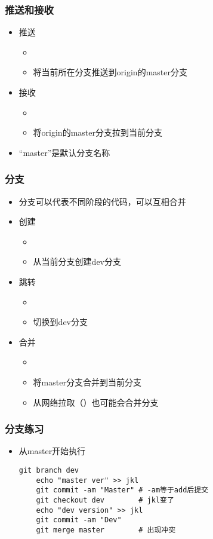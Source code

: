 \begin{frame} [fragile]
	\frametitle{推送和接收}
	\linespread{1.5}
	\begin{itemize}
	\item 推送
		\begin{itemize}
		\item {}
		\item 将当前所在分支推送到origin的master分支
		\end{itemize}
	\item 接收
		\begin{itemize}
		\item {}
		\item 将origin的master分支拉到当前分支
		\end{itemize}
	\item ``master''是默认分支名称
	\end{itemize}
\end{frame}

\begin{frame} [fragile]
	\frametitle{分支}
	\linespread{1.25}
	\begin{itemize}
	\item 分支可以代表不同阶段的代码，可以互相合并
	\item 创建
		\begin{itemize}
		\item {}
		\item 从当前分支创建dev分支
		\end{itemize}
	\item 跳转
		\begin{itemize}
		\item {}
		\item 切换到dev分支
		\end{itemize}
	\item 合并
		\begin{itemize}
		\item {}
		\item 将master分支合并到当前分支
		\item 从网络拉取（）也可能会合并分支
		\end{itemize}
	\end{itemize}
\end{frame}

\begin{frame} [fragile]
	\frametitle{分支练习}
	\linespread{1.5}
	\begin{itemize}
	\item 从master开始执行
	\begin{lstlisting}[style=bashstyle, gobble=4, texcl, escapechar=@]
	git branch dev
	echo "master ver" >> jkl
	git commit -am "Master"	# -am等于add后提交
	git checkout dev		# jkl变了
	echo "dev version" >> jkl
	git commit -am "Dev"
	git merge master		# 出现冲突
	\end{lstlisting}
	\end{itemize}
\end{frame}

